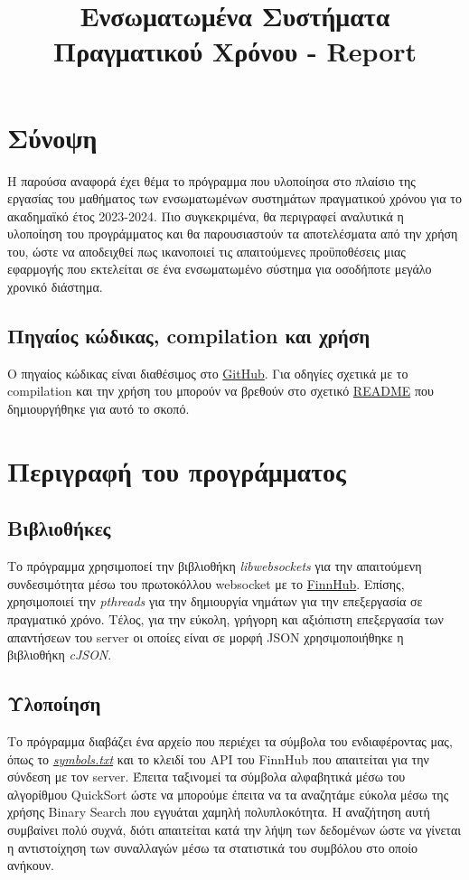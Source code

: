 \documentclass[11pt]{article}
\date{}
\title{Ενσωματωμένα Συστήματα Πραγματικού Χρόνου - Report}
\begin{document}
\maketitle
\section{Σύνοψη}
\label{sec:org00d854b}
Η παρούσα αναφορά έχει θέμα το πρόγραμμα που υλοποίησα στο πλαίσιο της εργασίας του μαθήματος των ενσωματωμένων συστημάτων πραγματικού χρόνου για το ακαδημαϊκό έτος 2023-2024. Πιο συγκεκριμένα, θα περιγραφεί αναλυτικά η υλοποίηση του προγράμματος και θα παρουσιαστούν τα αποτελέσματα από την χρήση του, ώστε να αποδειχθεί πως ικανοποιεί τις απαιτούμενες προϋποθέσεις μιας εφαρμογής που εκτελείται σε ένα ενσωματωμένο σύστημα για οσοδήποτε μεγάλο χρονικό διάστημα.
\subsection{Πηγαίος κώδικας, compilation και χρήση}
\label{sec:org8cf493c}
Ο πηγαίος κώδικας είναι διαθέσιμος στο \href{https://github.com/thetonk/tradestats}{GitHub}. Για οδηγίες σχετικά με το compilation και την χρήση του μπορούν να βρεθούν στο σχετικό \href{https://github.com/thetonk/tradestats/blob/main/README.md}{README} που δημιουργήθηκε για αυτό το σκοπό.
\section{Περιγραφή του προγράμματος}
\label{sec:orgfed89fc}
\subsection{Βιβλιοθήκες}
\label{sec:org02e4061}
Το πρόγραμμα χρησιμοποεί την βιβλιοθήκη \emph{libwebsockets} για την απαιτούμενη συνδεσιμότητα μέσω του πρωτοκόλλου websocket με το \href{https://finnhub.io}{FinnHub}. Επίσης, χρησιμοποιεί την \emph{pthreads} για την δημιουργία νημάτων για την επεξεργασία σε πραγματικό χρόνο. Τέλος, για την εύκολη, γρήγορη και αξιόπιστη επεξεργασία των απαντήσεων του server οι οποίες είναι σε μορφή JSON χρησιμοποιήθηκε η βιβλιοθήκη \emph{cJSON}.
\subsection{Υλοποίηση}
\label{sec:org807fcb6}
Το πρόγραμμα διαβάζει ένα αρχείο που περιέχει τα σύμβολα του ενδιαφέροντας μας, όπως το \emph{\href{https://github.com/thetonk/tradestats/blob/main/symbols.txt}{symbols.txt}} και το κλειδί του API του FinnHub που απαιτείται για την σύνδεση με τον server. Έπειτα ταξινομεί τα σύμβολα αλφαβητικά μέσω του αλγορίθμου QuickSort\autocite{enwiki:1241885213} ώστε να μπορούμε έπειτα να τα αναζητάμε εύκολα μέσω της χρήσης Binary Search που εγγυάται χαμηλή πολυπλοκότητα\autocite{enwiki:1242941867}. Η αναζήτηση αυτή συμβαίνει πολύ συχνά, διότι απαιτείται κατά την λήψη των δεδομένων ώστε να γίνεται η αντιστοίχηση των συναλλαγών μέσω τα στατιστικά του συμβόλου στο οποίο ανήκουν.\\
\end{document}
